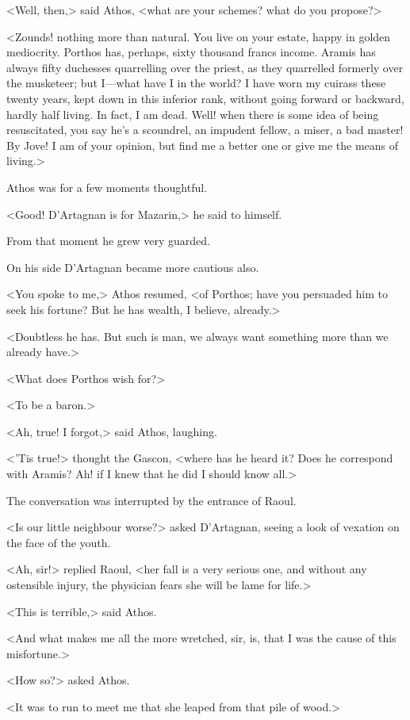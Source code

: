 <Well, then,> said Athos, <what are your schemes? what do you propose?>

<Zounds! nothing more than natural. You live on your estate, happy in golden mediocrity. Porthos has, perhaps, sixty thousand francs income. Aramis has always fifty duchesses quarrelling over the priest, as they quarrelled formerly over the musketeer; but I—what have I in the world? I have worn my cuirass these twenty years, kept down in this inferior rank, without going forward or backward, hardly half living. In fact, I am dead. Well! when there is some idea of being resuscitated, you say he's a scoundrel, an impudent fellow, a miser, a bad master! By Jove! I am of your opinion, but find me a better one or give me the means of living.>

Athos was for a few moments thoughtful.

<Good! D'Artagnan is for Mazarin,> he said to himself.

From that moment he grew very guarded.

On his side D'Artagnan became more cautious also.

<You spoke to me,> Athos resumed, <of Porthos; have you persuaded him to seek his fortune? But he has wealth, I believe, already.>

<Doubtless he has. But such is man, we always want something more than we already have.>

<What does Porthos wish for?>

<To be a baron.>

<Ah, true! I forgot,> said Athos, laughing.

<'Tis true!> thought the Gascon, <where has he heard it? Does he correspond with Aramis? Ah! if I knew that he did I should know all.>

The conversation was interrupted by the entrance of Raoul.

<Is our little neighbour worse?> asked D'Artagnan, seeing a look of vexation on the face of the youth.

<Ah, sir!> replied Raoul, <her fall is a very serious one, and without any ostensible injury, the physician fears she will be lame for life.>

<This is terrible,> said Athos.

<And what makes me all the more wretched, sir, is, that I was the cause of this misfortune.>

<How so?> asked Athos.

<It was to run to meet me that she leaped from that pile of wood.>


